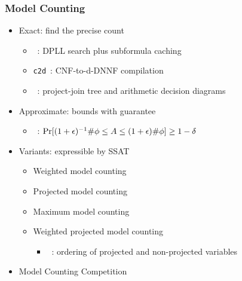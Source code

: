 \begin{frame}
      \frametitle{Model Counting}
      \begin{itemize}
            \item Exact: find the precise count
                  \pause
                  \begin{itemize}
                        \item \cachet~\cite{Sang2004,Sang2005ModelCounting}: DPLL search plus subformula caching
                              \pause
                        \item \texttt{c2d}~\cite{Darwiche2001,Darwiche2002dDNNF}: CNF-to-d-DNNF compilation
                              \pause
                        \item \dpmc~\cite{Dudek2020}: project-join tree and arithmetic decision diagrams
                              \pause
                  \end{itemize}
            \item Approximate: bounds with guarantee
                  \pause
                  \begin{itemize}
                        \item \approxmc~\cite{Chakraborty2013,Chakraborty2016}: $\Pr[(1+\epsilon)^{-1}\#\phi \leq A \leq (1+\epsilon)\#\phi] \geq 1-\delta$
                              \pause
                  \end{itemize}
            \item Variants: expressible by SSAT
                  \pause
                  \begin{itemize}
                        \item Weighted model counting~\cite{Sang2005BayesianInference,Chavira2008}
                              \pause
                        \item Projected model counting~\cite{Aziz2015}
                              \pause
                        \item Maximum model counting~\cite{Fremont2017}
                              \pause
                        \item Weighted projected model counting
                              \pause
                              \begin{itemize}
                                    \item \procount~\cite{Dudek2021}: ordering of projected and non-projected variables
                                          \pause
                              \end{itemize}
                  \end{itemize}
            \item Model Counting Competition~\cite{MC-COMP2020}
      \end{itemize}
\end{frame}

